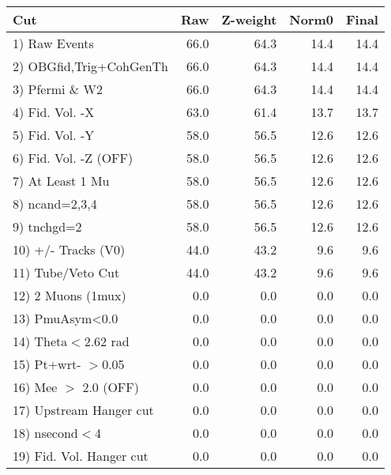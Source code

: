  \begin{table}[h!]\centering
 \begin{tabular}{||l||r|r|r|r||}
 \hline
 \hline
 Cut & Raw & Z-weight & Norm0 & Final \\
 \hline
  1) Raw Events           &        66.0 &        64.3 &        14.4 &        14.4 \\
  2) OBGfid,Trig+CohGenTh &        66.0 &        64.3 &        14.4 &        14.4 \\
  3) Pfermi \& W2         &        66.0 &        64.3 &        14.4 &        14.4 \\
  4) Fid. Vol. -X         &        63.0 &        61.4 &        13.7 &        13.7 \\
  5) Fid. Vol. -Y         &        58.0 &        56.5 &        12.6 &        12.6 \\
  6) Fid. Vol. -Z (OFF)   &        58.0 &        56.5 &        12.6 &        12.6 \\
  7) At Least 1 Mu        &        58.0 &        56.5 &        12.6 &        12.6 \\
  8) ncand=2,3,4          &        58.0 &        56.5 &        12.6 &        12.6 \\
  9) tnchgd=2             &        58.0 &        56.5 &        12.6 &        12.6 \\
 10) +/- Tracks (V0)      &        44.0 &        43.2 &         9.6 &         9.6 \\
 11) Tube/Veto Cut        &        44.0 &        43.2 &         9.6 &         9.6 \\
 12) 2 Muons (1mux)       &         0.0 &         0.0 &         0.0 &         0.0 \\
 13) PmuAsym<0.0          &         0.0 &         0.0 &         0.0 &         0.0 \\
 14) Theta$<$2.62 rad     &         0.0 &         0.0 &         0.0 &         0.0 \\
 15) Pt+wrt- $>$0.05      &         0.0 &         0.0 &         0.0 &         0.0 \\
 16) Mee $>$ 2.0  (OFF)   &         0.0 &         0.0 &         0.0 &         0.0 \\
 17) Upstream Hanger cut  &         0.0 &         0.0 &         0.0 &         0.0 \\
 18) nsecond$<$4          &         0.0 &         0.0 &         0.0 &         0.0 \\
 19) Fid. Vol. Hanger cut &         0.0 &         0.0 &         0.0 &         0.0 \\

\end{tabular}
\end{table}
